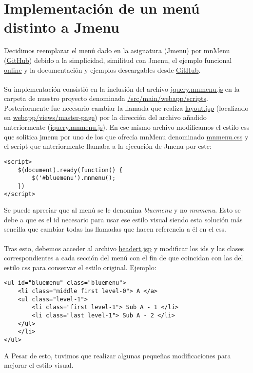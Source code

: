 \documentclass{scrartcl}
\begin{document}
\section{Implementación de un menú distinto a Jmenu}
Decidimos reemplazar el menú dado en la asignatura (Jmenu) por mnMenu (\href{https://github.com/manusa/mnmenu}{GitHub}) debido a la simplicidad, similitud con Jmenu, el ejemplo funcional \href{http://www.marcnuri.com/en/content/mnmenu-dropdown-jquery-menu}{online} y la documentación y ejemplos descargables desde \href{https://github.com/manusa/mnmenu}{GitHub}.
\\
\\
Su implementación consistió en la inclusión del archivo \href{https://github.com/manusa/mnmenu/blob/master/src/jquery.mnmenu.js}{jquery.mnmenu.js} en la carpeta de nuestro proyecto denominada \href{https://github.com/DPIRPSG/DP1Entrega/tree/master/L01Workspace/Getting-Started-Menu/src/main/webapp/scripts}{/src/main/webapp/scripts}. Posteriormente fue necesario cambiar la llamada que realiza \href{https://github.com/DPIRPSG/DP1Entrega/blob/master/L01Workspace/Getting-Started-Menu/src/main/webapp/views/master-page/layout.jsp}{layout.jsp} (localizado en \href{https://github.com/DPIRPSG/DP1Entrega/blob/master/L01Workspace/Getting-Started-Menu/src/main/webapp/views/master-page/}{webapp/views/master-page}) por la dirección del archivo añadido anteriormente (\href{https://github.com/DPIRPSG/DP1Entrega/tree/master/L01Workspace/Getting-Started-Menu/src/main/webapp/scripts/jquery.mnmenu.js}{jquery.mnmenu.js}).
En ese mismo archivo modificamos el estilo css que solitica jmenu por uno de los que ofrecía mnMenu denominado \href{https://github.com/DPIRPSG/DP1Entrega/blob/Item5-6/L01Workspace/Getting-Started-Menu/src/main/webapp/styles/mnmenu.css}{mnmenu.css} y el script que anteriormente llamaba a la ejecución de Jmenu por este:
\begin{lstlisting}[frame=single]
<script>
	$(document).ready(function() {
		$('#bluemenu').mnmenu();
	})
</script>
\end{lstlisting}
Se puede apreciar que al menú se le denomina \textit{bluemenu} y no \textit{mnmenu}. Esto se debe a que es el id necesario para usar ese estilo visual siendo esta solución más sencilla que cambiar todas las llamadas que hacen referencia a él en el css.
\\
\\
Tras esto, debemos acceder al archivo \href{https://github.com/DPIRPSG/DP1Entrega/blob/master/L01Workspace/Getting-Started-Menu/src/main/webapp/views/master-page/header.jsp}{headert.jsp} y modificar los ids y las clases correspondientes a cada sección del menú con el fin de que coincidan con las del estilo css para conservar el estilo original. Ejemplo:
\begin{lstlisting}[frame=single]
<ul id="bluemenu" class="bluemenu"> 
	<li class="middle first level-0"> A </a>
	<ul class="level-1">
		<li class="first level-1"> Sub A - 1 </li>
		<li class="last level-1"> Sub A - 2 </li>					
	</ul>
	</li>
</ul>
\end{lstlisting}



A Pesar de esto, tuvimos que realizar algunas pequeñas modificaciones para mejorar el estilo visual.
\end{document}
